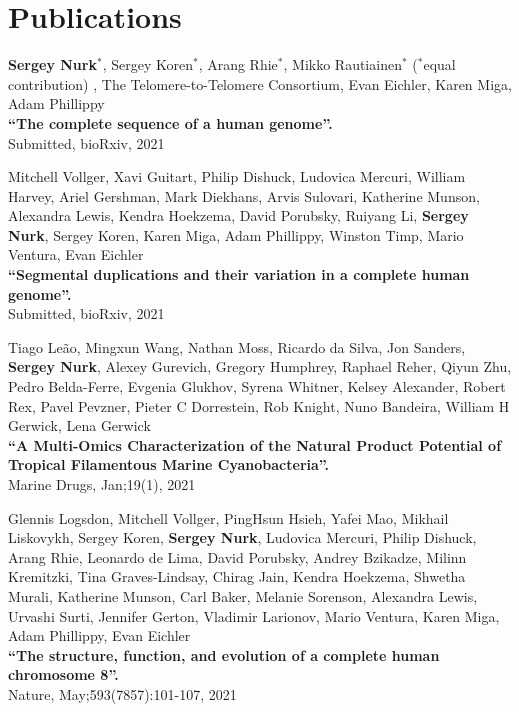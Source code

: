 \section{Publications}
\vspace*{-.7cm}
%
\begin{outerlist}

\item
\textbf{Sergey Nurk}$^*$, Sergey Koren$^*$, Arang Rhie$^*$, Mikko Rautiainen$^*$ ($^*$equal contribution)%
, The Telomere-to-Telomere Consortium, Evan Eichler, Karen Miga, Adam Phillippy\\
\textbf{``The complete sequence of a human genome''.}\\
Submitted, bioRxiv, 2021

\item
Mitchell Vollger, Xavi Guitart, Philip Dishuck, Ludovica Mercuri, William Harvey, Ariel Gershman, Mark Diekhans, Arvis Sulovari, Katherine Munson, Alexandra Lewis, Kendra Hoekzema, David Porubsky, Ruiyang Li, \textbf{Sergey Nurk}, Sergey Koren, Karen Miga, Adam Phillippy, Winston Timp, Mario Ventura, Evan Eichler\\
\textbf{``Segmental duplications and their variation in a complete human genome''.}\\
Submitted, bioRxiv, 2021

\item
Tiago Leão, Mingxun Wang, Nathan Moss, Ricardo da Silva, Jon Sanders, \textbf{Sergey Nurk}, Alexey Gurevich, Gregory Humphrey, Raphael Reher, Qiyun Zhu, Pedro Belda-Ferre, Evgenia Glukhov, Syrena Whitner, Kelsey Alexander, Robert Rex, Pavel Pevzner, Pieter C Dorrestein, Rob Knight, Nuno Bandeira, William H Gerwick, Lena Gerwick\\
\textbf{``A Multi-Omics Characterization of the Natural Product Potential of Tropical Filamentous Marine Cyanobacteria''.}\\
Marine Drugs, Jan;19(1), 2021

\item
Glennis Logsdon, Mitchell Vollger, PingHsun Hsieh, Yafei Mao, Mikhail Liskovykh, Sergey Koren, \textbf{Sergey Nurk}, Ludovica Mercuri, Philip Dishuck, Arang Rhie, Leonardo de Lima, David Porubsky, Andrey Bzikadze, Milinn Kremitzki, Tina Graves-Lindsay, Chirag Jain, Kendra Hoekzema, Shwetha Murali, Katherine Munson, Carl Baker, Melanie Sorenson, Alexandra Lewis, Urvashi Surti, Jennifer Gerton, Vladimir Larionov, Mario Ventura, Karen Miga, Adam Phillippy, Evan Eichler\\
\textbf{``The structure, function, and evolution of a complete human chromosome 8''.}\\
Nature, May;593(7857):101-107, 2021


\end{outerlist}
